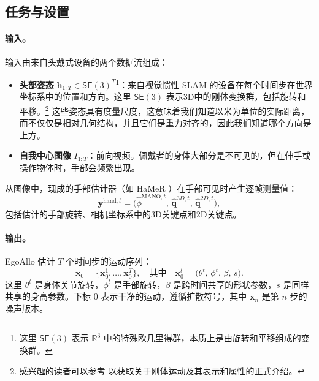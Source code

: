\documentclass[../../book-main_zh.tex]{subfiles}
\begin{document}
\subsection{任务与设置}
\label{sub:egoallo_objective}

\paragraph{输入。}
输入由来自头戴式设备的两个数据流组成：
\begin{itemize}
    \item \textbf{头部姿态} $\boldsymbol{h}_{1:T} \in \mathsf{SE}(3)^T$\footnote{这里 $\mathsf{SE}(3)$ 表示 $\mathbb{R}^3$ 中的特殊欧几里得群，本质上是由旋转和平移组成的变换群。}：来自视觉惯性 SLAM 的设备在每个时间步在世界坐标系中的位置和方向。这里 $\mathsf{SE}(3)$ 表示3D中的刚体变换群，包括旋转和平移。\footnote{感兴趣的读者可以参考 \cite{MaY2003} 以获取关于刚体运动及其表示和属性的正式介绍。} 这些姿态具有度量尺度，这意味着我们知道以米为单位的实际距离，而不仅仅是相对几何结构，并且它们是重力对齐的，因此我们知道哪个方向是上方。
    \item \textbf{自我中心图像} $I_{1:T}$：前向视频。佩戴者的身体大部分是不可见的，但在伸手或操作物体时，手部会频繁出现。
\end{itemize}

从图像中，现成的手部估计器（如 HaMeR \citep{pavlakos2023hamer}）在手部可见时产生逐帧测量值：
\begin{equation}
    \boldsymbol{y}^{\text{hand},t} = \big(\hat{\phi}^{\text{MANO},t},\,
    \hat{\boldsymbol{q}}^{3D,t},\, \hat{\boldsymbol{q}}^{2D,t}\big),
\end{equation}
包括估计的手部旋转、相机坐标系中的3D关键点和2D关键点。

\paragraph{输出。}
EgoAllo 估计 $T$ 个时间步的运动序列：
\begin{equation}
    \boldsymbol{x}_0 = \{\boldsymbol{x}_0^{1}, \dots, \boldsymbol{x}_0^{T}\},
    \quad\text{其中}\quad
    \boldsymbol{x}_0^{t} = \big(\theta^t,\, \phi^t,\, \beta,\, s\big).
\end{equation}
这里 $\theta^t$ 是身体关节旋转，$\phi^t$ 是手部旋转，$\beta$ 是跨时间共享的形状参数，$s$ 是同样共享的身高参数。下标 $0$ 表示干净的运动，遵循扩散符号，其中 $\boldsymbol{x}_n$ 是第 $n$ 步的噪声版本。
\end{document}
